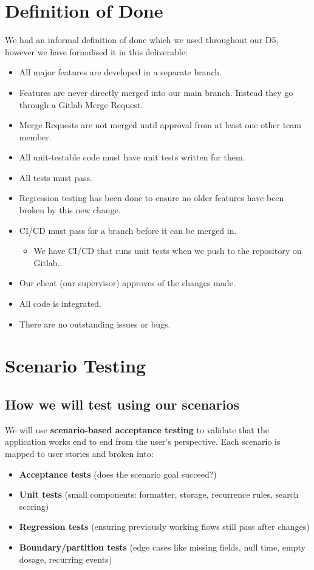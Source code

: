 \documentclass[a4paper,12pt]{article}
\begin{document}
\section{Definition of Done}
We had an informal definition of done which we used throughout our D5, however we have formalised it in this deliverable:
\begin{itemize}
    \item All major features are developed in a separate branch.
    \item Features are never directly merged into our main branch. Instead they go through a Gitlab Merge Request.
    \item Merge Requests are not merged until approval from at least one other team member.
    \item All unit-testable code must have unit tests written for them.
    \item All tests must pass.
    \item Regression testing has been done to ensure no older features have been broken by this new change.
    \item CI/CD must pass for a branch before it can be merged in.
    \begin{itemize}
        \item We have CI/CD that runs unit tests when we push to the repository on Gitlab..
    \end{itemize}
    \item Our client (our supervisor) approves of the changes made.
    \item All code is integrated.
    \item There are no outstanding issues or bugs.
\end{itemize}

\newpage
\section{Scenario Testing}

\subsection{How we will test using our scenarios}

We will use \textbf{scenario-based acceptance testing} to validate that the application works end to end from the user's perspective. Each scenario is mapped to user stories and broken into:
\begin{itemize}
    \item \textbf{Acceptance tests} (does the scenario goal succeed?)
    \item \textbf{Unit tests} (small components: formatter, storage, recurrence rules, search scoring)
    \item \textbf{Regression tests} (ensuring previously working flows still pass after changes)
    \item \textbf{Boundary/partition tests} (edge cases like missing fields, null time, empty dosage, recurring events)
\end{itemize}
\end{document}
